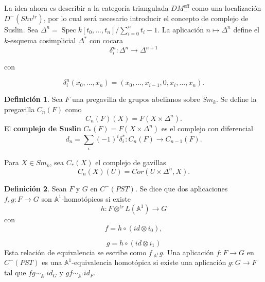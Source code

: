 \documentclass[10pt]{amsart}
\theoremstyle{definition}
\newtheorem{definition}{Definici\'on}[section]
\theoremstyle{remark}
\theoremstyle{definition}
\newcommand{\spec}{\operatorname{Spec}}
\begin{document}
La idea ahora es describir a la categoría triangulada $DM^{\textrm{eff}}_{-}$ como una localización $D^{-}(Shv^{tr})$, por lo cual será necesario introducir el concepto de complejo de Suslin. Sea $\Delta^{n}=\spec\mathit{k}[t_{0},...,t_{n}]/\sum_{i=0}^{n}t_{i}-1$. La aplicación $n \mapsto \Delta^{n}$ define el $\mathit{k}$-esquema cosimplicial $\Delta^{*}$ con cocara
\begin{equation*}
\delta^{n}_{i}:\Delta^{n} \rightarrow \Delta^{n+1}
\end{equation*}

con

\begin{equation*}
\delta^{n}_{i}(x_{0},...,x_{n})=(x_{0},...,x_{i-1},0,x_{i},...,x_{n}).
\end{equation*}

\begin{definition}
Sea $F$ una pregavilla de grupos abelianos sobre $Sm_{\mathit{k}}$. Se define la pregavilla $C_{n}(F)$ como 
\begin{equation*}
C_{n}(F)(X)=F(X \times \Delta^{n}).
\end{equation*}
El \textbf{complejo de Suslin} $C_{*}(F)=F(X \times \Delta^{n})$ es el complejo con diferencial
\begin{equation*}
d_{n}=\sum_{i}(-1)^{i}\delta^{*}_{i}:C_{n}(F) \rightarrow C_{n-1}(F).
\end{equation*}

Para $X \in Sm_{\mathit{k}}$, sea $C_{*}(X)$ el complejo de gavillas
\begin{equation*}
C_{n}(X)(U)=Cor(U\times \Delta^{n},X).
\end{equation*}
\end{definition}

\begin{definition}
Sean $F$ y $G$ en $C^{-}(PST)$. Se dice que dos aplicaciones $f,g:F \rightarrow G$ son $\mathbb{A}^{1}$-homotópicos si existe
\begin{equation*}
h:F \otimes^{tr} L(\mathbb{A}^1) \rightarrow G
\end{equation*}
con
\begin{equation*}
f=h \circ (id \otimes i_{0}),
\end{equation*}

\begin{equation*}
g=h \circ(id \otimes i_{1})
\end{equation*}
Esta relación de equivalencia se escribe como $f ~_{\mathbb{A}^1} g$. Una aplicación $f:F \rightarrow G$ en $C^{-}(PST)$ es una $\mathbb{A}^1$-equivalencia homotópica si existe una aplicación $g:G \rightarrow F$ tal que $fg\sim_{\mathbb{A}^1} id_{G}$ y $gf\sim_{\mathbb{A}^1} id_{F}$.
\end{definition}
\end{document}
